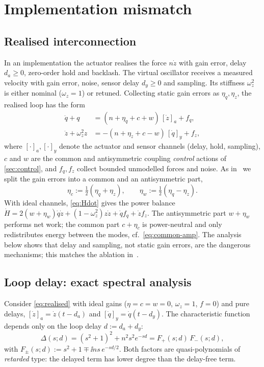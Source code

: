 \section{Implementation mismatch}\label{sec:mismatch}

\subsection{Realised interconnection}
In an implementation the actuator realises the force $n\dot z$ with gain error,
delay $d_a\ge0$, zero-order hold and backlash.
The virtual oscillator receives a measured velocity with gain error, noise,
sensor delay $d_y\ge0$ and sampling.
Its stiffness $\omega_z^2$ is either nominal ($\omega_z=1$) or retuned.
Collecting static gain errors as $\eta_q,\eta_z$, the realised loop has the form
\begin{equation}\label{eq:realised}
\begin{aligned}
  \ddot q+q&=(n+\eta_q+c+w)\,[\dot z]_a+f_q,\\
  \ddot z+\omega_z^2z&=-(n+\eta_z+c-w)\,[\dot q]_y+f_z,
\end{aligned}
\end{equation}
where $[\cdot]_a,[\cdot]_y$ denote the actuator and sensor channels (delay, hold,
sampling), $c$ and $w$ are the common and antisymmetric coupling \emph{control}
actions of \cref{sec:control}, and $f_q,f_z$ collect bounded unmodelled forces
and noise.
As in~\citet{juchem2027restoring} we split the gain errors into a common and an
antisymmetric part,
\begin{equation}\label{eq:eta-split}
  \eta_c:=\tfrac12(\eta_q+\eta_z),\qquad \eta_w:=\tfrac12(\eta_q-\eta_z).
\end{equation}
With ideal channels, \eqref{eq:Hdot} gives the power balance
$\dot H=2(w+\eta_w)\dot q\dot z+(1-\omega_z^2)z\dot z+\dot qf_q+\dot zf_z$.
The antisymmetric part $w+\eta_w$ performs net work; the common part $c+\eta_c$
is power-neutral and only redistributes energy between the modes,
cf.~\eqref{eq:common-amp}.
The analysis below shows that delay and sampling, not static gain errors, are
the dangerous mechanisms; this matches the ablation in~\citet[Table~I]{juchem2027restoring}.

\subsection{Loop delay: exact spectral analysis}\label{sec:delay}
Consider \eqref{eq:realised} with ideal gains ($\eta=c=w=0$, $\omega_z=1$,
$f=0$) and pure delays, $[\dot z]_a=\dot z(t-d_a)$ and
$[\dot q]_y=\dot q(t-d_y)$.
The characteristic function depends only on the loop delay $d:=d_a+d_y$:
\begin{equation}\label{eq:quasi}
  \Delta(s;d)=(s^2+1)^2+n^2s^2e^{-sd}
  =F_+(s;d)\,F_-(s;d),
\end{equation}
with $F_\pm(s;d):=s^2+1\mp\ii ns\,e^{-sd/2}$.
Both factors are quasi-polynomials of \emph{retarded} type: the delayed term has
lower degree than the delay-free term.

